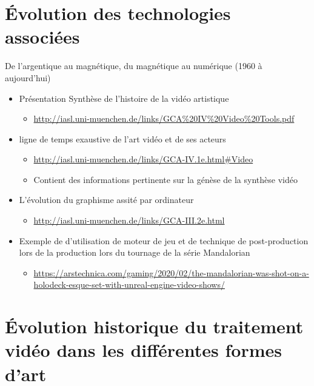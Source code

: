\documentclass[
  french,
]{book}
\providecommand{\tightlist}{%
  \setlength{\itemsep}{0pt}\setlength{\parskip}{0pt}}
\begin{document}
\hypertarget{evolution_historique_technologies}{%
\section{Évolution des technologies associées}\label{evolution_historique_technologies}}

De l'argentique au magnétique, du magnétique au numérique (1960 à aujourd'hui)

\begin{itemize}
\tightlist
\item
  Présentation Synthèse de l'histoire de la vidéo artistique

  \begin{itemize}
  \tightlist
  \item
    \url{http://iasl.uni-muenchen.de/links/GCA\%20IV\%20Video\%20Tools.pdf}
  \end{itemize}
\item
  ligne de temps exaustive de l'art vidéo et de ses acteurs

  \begin{itemize}
  \tightlist
  \item
    \url{http://iasl.uni-muenchen.de/links/GCA-IV.1e.html\#Video}
  \item
    Contient des informations pertinente sur la génèse de la synthèse vidéo
  \end{itemize}
\item
  L'évolution du graphisme assité par ordinateur

  \begin{itemize}
  \tightlist
  \item
    \url{http://iasl.uni-muenchen.de/links/GCA-III.2e.html}
  \end{itemize}
\item
  Exemple de d'utilisation de moteur de jeu et de technique de post-production lors de la production lors du tournage de la série Mandalorian

  \begin{itemize}
  \tightlist
  \item
    \url{https://arstechnica.com/gaming/2020/02/the-mandalorian-was-shot-on-a-holodeck-esque-set-with-unreal-engine-video-shows/}
  \end{itemize}
\end{itemize}

\hypertarget{evolution_historique}{%
\section{Évolution historique du traitement vidéo dans les différentes formes d'art}\label{evolution_historique}}
\end{document}
